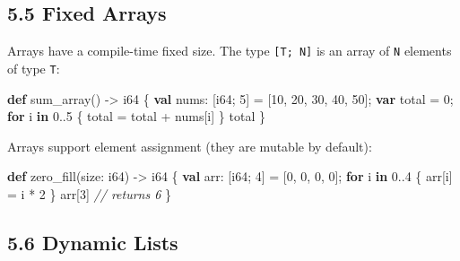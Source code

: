 \documentclass[
  english,
]{book}
\newenvironment{Shaded}{\begin{snugshade}}{\end{snugshade}}
\newcommand{\CommentTok}[1]{\textcolor[rgb]{0.42,0.60,0.33}{\textit{#1}}}
\newcommand{\ControlFlowTok}[1]{\textcolor[rgb]{0.77,0.53,0.75}{\textbf{#1}}}
\newcommand{\DataTypeTok}[1]{\textcolor[rgb]{0.31,0.79,0.69}{#1}}
\newcommand{\DecValTok}[1]{\textcolor[rgb]{0.71,0.81,0.66}{#1}}
\newcommand{\KeywordTok}[1]{\textcolor[rgb]{0.34,0.61,0.84}{\textbf{#1}}}
\newcommand{\NormalTok}[1]{\textcolor[rgb]{0.83,0.83,0.83}{#1}}
\newcommand{\OperatorTok}[1]{\textcolor[rgb]{0.83,0.83,0.83}{#1}}
\begin{document}
\subsection{5.5 Fixed Arrays}\label{fixed-arrays}

Arrays have a compile-time fixed size. The type \texttt{{[}T;\ N{]}} is
an array of \texttt{N} elements of type \texttt{T}:

\begin{Shaded}
\begin{Highlighting}[]
\KeywordTok{def}\NormalTok{ sum\_array() }\OperatorTok{{-}\textgreater{}} \DataTypeTok{i64}\NormalTok{ \{}
    \KeywordTok{val}\NormalTok{ nums: [}\DataTypeTok{i64}\NormalTok{; }\DecValTok{5}\NormalTok{] }\OperatorTok{=}\NormalTok{ [}\DecValTok{10}\NormalTok{, }\DecValTok{20}\NormalTok{, }\DecValTok{30}\NormalTok{, }\DecValTok{40}\NormalTok{, }\DecValTok{50}\NormalTok{];}
    \KeywordTok{var}\NormalTok{ total }\OperatorTok{=} \DecValTok{0}\NormalTok{;}
    \ControlFlowTok{for}\NormalTok{ i }\ControlFlowTok{in} \DecValTok{0}\OperatorTok{..}\DecValTok{5}\NormalTok{ \{}
\NormalTok{        total }\OperatorTok{=}\NormalTok{ total }\OperatorTok{+}\NormalTok{ nums[i]}
\NormalTok{    \}}
\NormalTok{    total}
\NormalTok{\}}
\end{Highlighting}
\end{Shaded}

Arrays support element assignment (they are mutable by default):

\begin{Shaded}
\begin{Highlighting}[]
\KeywordTok{def}\NormalTok{ zero\_fill(size: }\DataTypeTok{i64}\NormalTok{) }\OperatorTok{{-}\textgreater{}} \DataTypeTok{i64}\NormalTok{ \{}
    \KeywordTok{val}\NormalTok{ arr: [}\DataTypeTok{i64}\NormalTok{; }\DecValTok{4}\NormalTok{] }\OperatorTok{=}\NormalTok{ [}\DecValTok{0}\NormalTok{, }\DecValTok{0}\NormalTok{, }\DecValTok{0}\NormalTok{, }\DecValTok{0}\NormalTok{];}
    \ControlFlowTok{for}\NormalTok{ i }\ControlFlowTok{in} \DecValTok{0}\OperatorTok{..}\DecValTok{4}\NormalTok{ \{}
\NormalTok{        arr[i] }\OperatorTok{=}\NormalTok{ i }\OperatorTok{*} \DecValTok{2}
\NormalTok{    \}}
\NormalTok{    arr[}\DecValTok{3}\NormalTok{]   }\CommentTok{// returns 6}
\NormalTok{\}}
\end{Highlighting}
\end{Shaded}

\subsection{5.6 Dynamic Lists}\label{dynamic-lists}
\end{document}
